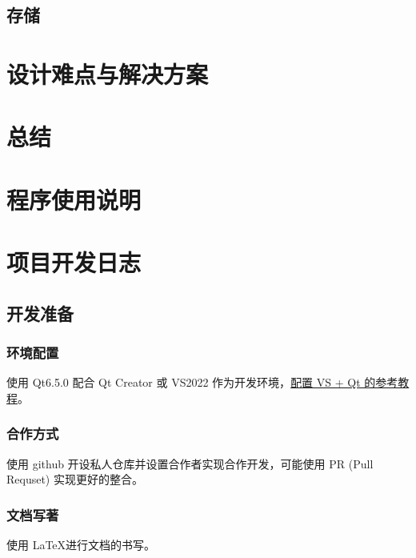 \documentclass{./source/Report}
\begin{document}
\subsection{存储}

\section{设计难点与解决方案}

\section{总结}

\newpage
\appendix
\section{程序使用说明}

\section{项目开发日志}

\subsection{开发准备}
\subsubsection{环境配置}
使用 Qt6.5.0 配合 Qt Creator 或 VS2022 作为开发环境，\href{https://blog.csdn.net/m0_62919535/article/details/129340079}{配置 VS + Qt 的参考教程}。

\subsubsection{合作方式}
使用 github 开设私人仓库并设置合作者实现合作开发，可能使用 PR (Pull Requset) 实现更好的整合。

\subsubsection{文档写著}
使用 \LaTeX 进行文档的书写。
\end{document}

